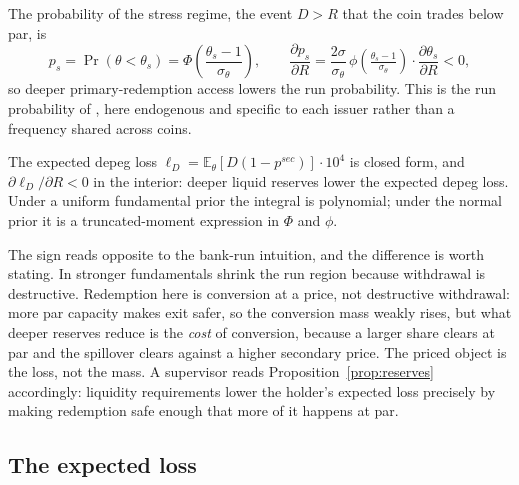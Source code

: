 \begin{proposition}\label{prop:ps}
The probability of the stress regime, the event $D > R$ that the coin trades below par, is
\begin{equation}\label{eq:ps}
p_s = \Pr(\theta < \theta_s) = \Phi\!\left(\frac{\theta_s - 1}{\sigma_\theta}\right),
\qquad \frac{\partial p_s}{\partial R} = \frac{2\sigma}{\sigma_\theta}\,\phi\!\left(\tfrac{\theta_s-1}{\sigma_\theta}\right)\!\cdot\!\frac{\partial \theta_s}{\partial R} < 0,
\end{equation}
so deeper primary-redemption access lowers the run probability. This is the run probability of \citet{klee_etal_2026_fragility}, here endogenous and specific to each issuer rather than a frequency shared across coins.
\end{proposition}

\begin{proposition}\label{prop:reserves}
The expected depeg loss $\ell_D = \mathbb{E}_\theta[D(1-p^{sec})]\cdot 10^4$ is closed form, and $\partial \ell_D/\partial R < 0$ in the interior: deeper liquid reserves lower the expected depeg loss. Under a uniform fundamental prior the integral is polynomial; under the normal prior it is a truncated-moment expression in $\Phi$ and $\phi$.
\end{proposition}

The sign reads opposite to the bank-run intuition, and the difference is worth stating. In \citet{goldstein_pauzner_2005_demand_deposits} stronger fundamentals shrink the run region because withdrawal is destructive. Redemption here is conversion at a price, not destructive withdrawal: more par capacity makes exit safer, so the conversion mass weakly rises, but what deeper reserves reduce is the \emph{cost} of conversion, because a larger share clears at par and the spillover clears against a higher secondary price. The priced object is the loss, not the mass. A supervisor reads Proposition~\ref{prop:reserves} accordingly: liquidity requirements lower the holder's expected loss precisely by making redemption safe enough that more of it happens at par.

\subsection{The expected loss}\label{sub:what_it_delivers}

